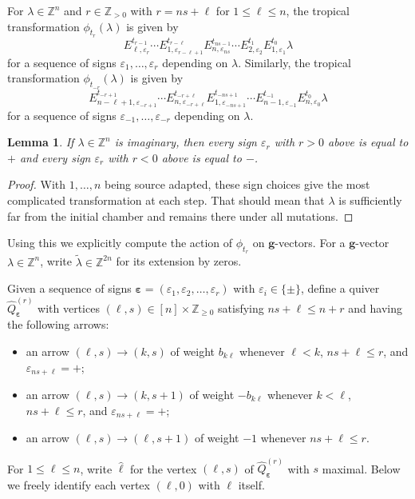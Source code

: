 \documentclass{amsart}
\newtheorem{lemma}[theorem]{Lemma}
\numberwithin{theorem}{section}
\newcommand{\bfg}{\boldsymbol{g}}
\newcommand{\ZZ}{\mathbb{Z}}
\newcommand{\beps}{{\boldsymbol{\varepsilon}}}
\begin{document}
  For $\lambda\in\ZZ^n$ and $r\in\ZZ_{>0}$ with $r=ns+\ell$ for $1\le\ell\le n$, the tropical transformation $\phi_{t_r}(\lambda)$ is given by
  \[
    E^{t_{r-1}}_{\ell,\varepsilon_r} \cdots E^{t_{r-\ell}}_{1,\varepsilon_{r-\ell+1}} E^{t_{ns-1}}_{n,\varepsilon_{ns}} \cdots E^{t_1}_{2,\varepsilon_2} E^{t_0}_{1,\varepsilon_1} \lambda
  \]
  for a sequence of signs $\varepsilon_1,\ldots,\varepsilon_r$ depending on $\lambda$.
  Similarly, the tropical transformation $\phi_{t_{-r}}(\lambda)$ is given by
  \[
    E^{t_{-r+1}}_{n-\ell+1,\varepsilon_{-r+1}} \cdots E^{t_{-r+\ell}}_{n,\varepsilon_{-r+\ell}} E^{t_{-ns+1}}_{1,\varepsilon_{-ns+1}} \cdots E^{t_{-1}}_{n-1,\varepsilon_{-1}} E^{t_0}_{n,\varepsilon_0} \lambda
  \]
  for a sequence of signs $\varepsilon_{-1},\ldots,\varepsilon_{-r}$ depending on $\lambda$.
  \begin{lemma}
    \label{lem:imaginary mutations}
    If $\lambda\in\ZZ^n$ is imaginary, then every sign $\varepsilon_r$ with $r>0$ above is equal to $+$ and every sign $\varepsilon_r$ with $r<0$ above is equal to $-$.
  \end{lemma}
  \begin{proof}
    With $1,\ldots,n$ being source adapted, these sign choices give the most complicated transformation at each step.
    That should mean that $\lambda$ is sufficiently far from the initial chamber and remains there under all mutations.
  \end{proof}

  Using this we explicitly compute the action of $\phi_{t_r}$ on $\bfg$-vectors. 
  For a $\bfg$-vector $\lambda\in\ZZ^n$, write $\tilde\lambda\in\ZZ^{2n}$ for its extension by zeros.

  Given a sequence of signs $\beps=(\varepsilon_1,\varepsilon_2,\ldots,\varepsilon_r)$ with $\varepsilon_i\in\{\pm\}$, define a quiver $\widehat{Q}^{(r)}_\beps$ with vertices $(\ell,s)\in [n]\times\ZZ_{\ge0}$ satisfying $ns+\ell\le n+r$ and having the following arrows:
  \begin{itemize}
    \item an arrow $(\ell,s)\to (k,s)$ of weight $b_{k\ell}$ whenever $\ell<k$, $ns+\ell\le r$, and $\varepsilon_{ns+\ell}=+$;
    \item an arrow $(\ell,s)\to (k,s+1)$ of weight $-b_{k\ell}$ whenever $k<\ell$, $ns+\ell\le r$, and $\varepsilon_{ns+\ell}=+$;
    \item an arrow $(\ell,s)\to (\ell,s+1)$ of weight $-1$ whenever $ns+\ell\le r$.
  \end{itemize}
  For $1\le\ell\le n$, write $\hat{\ell}$ for the vertex $(\ell,s)$ of $\widehat{Q}^{(r)}_\beps$ with $s$ maximal.
  Below we freely identify each vertex $(\ell,0)$ with $\ell$ itself.
\end{document}

